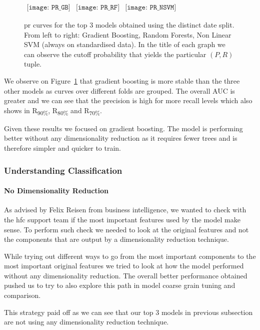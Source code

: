 \begin{figure}[h]
\begin{center}$
\begin{array}{ccc}
\texttt{[image: PR\_GB]} &
\texttt{[image: PR\_RF]} &
\texttt{[image: PR\_NSVM]}
\end{array}$
\end{center}
\caption{\label{PR_curves} \acrlong{pr} curves for the top 3 models obtained using the distinct date split. From left to right: Gradient Boosting, Random Forests, Non Linear SVM (always on standardised data). In the title of each graph we can observe the cutoff probability that yields the particular $(P,R)$ tuple.}
\end{figure}

We observe on Figure~\ref{PR_curves} that gradient boosting is more stable than the three other models as curves over different folds are grouped. The overall AUC is greater and we can see that the precision is high for more recall levels which also shows in R\textsubscript{90\%}, R\textsubscript{80\%} and R\textsubscript{70\%}. 

Given these results we focused on gradient boosting. The model is performing better without any dimensionality reduction as it requires fewer trees and is therefore simpler and quicker to train. 


\subsubsection{Understanding Classification}
\paragraph{No Dimensionality Reduction}
As advised by Felix Reisen from business intelligence, we wanted to check with the \acrshort{hfc} support team if the most important features used by the model make sense. To perform such check we needed to look at the original features and not the components that are output by a dimensionality reduction technique. 

While trying out different ways to go from the most important components to the most important original features we tried to look at how the model performed without any dimensionality reduction. The overall better performance obtained pushed us to try to also explore this path in model coarse grain tuning and comparison. 

This strategy paid off as we can see that our top 3 models in previous subsection are not using any dimensionality reduction technique. 

